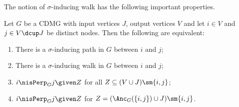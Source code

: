 The notion of $\sigma$-inducing walk has the following important properties.
\begin{Prp}\label{prp:sigma-inducing_path_properties}
  Let $G$ be a CDMG with input vertices $J$, output vertices $V$ and let $i \in V$ and $j \in V \dcup J$ be distinct nodes. 
  Then the following are equivalent:
  \begin{enumerate}[label=(\roman*)]
    \item There is a $\sigma$-inducing path in $G$ between $i$ and $j$;\label{prp:sigma-inducing_path_properties2:i}
    \item There is a $\sigma$-inducing walk in $G$ between $i$ and $j$;\label{prp:sigma-inducing_path_properties2:ii}
    \item $i \nisPerp_G j \given Z$ for all $Z \subseteq (V \cup J) \sm \{i,j\}$;\label{prp:sigma-inducing_path_properties2:iii}
    \item $i \nisPerp_G j \given Z$ for $Z = (\Anc_G(\{i,j\}) \cup J) \sm \{i,j\}$.\label{prp:sigma-inducing_path_properties2:iv}
  \end{enumerate}
\end{Prp}
